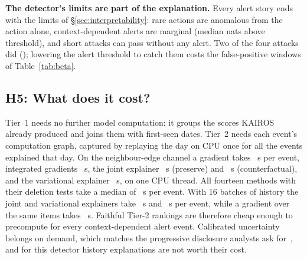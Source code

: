 \documentclass[conference]{IEEEtran}
\begin{document}
\textbf{The detector's limits are part of the explanation.} Every alert story ends with the limits of
\S\ref{sec:interpretability}: rare actions are anomalous from the action alone, context-dependent alerts
are marginal (median \HAWinMargin{} nats above threshold), and short attacks can pass without any alert.
Two of the four attacks did (\MissedAttacks{}); lowering the alert threshold to catch them costs the
false-positive windows of Table~\ref{tab:beta}.
\subsection{H5: What does it cost?}
Tier~1 needs no further model computation: it groups the scores KAIROS already produced and joins them
with first-seen dates. Tier~2 needs each event's computation graph, captured by replaying the day on CPU
once for all the events explained that day. On the neighbour-edge channel a gradient takes
\HAWinGradientTime{}~s per event, integrated gradients \HAWinIntGradTime{}~s, the joint explainer
\HAWinJointTime{}~s (preserve) and \HAWinJointCFTime{}~s (counterfactual), and the variational explainer
\HAWinVariationalTime{}~s, on one CPU thread. All fourteen methods with their deletion tests take a
median of \HAWallMedian{}~s per event. With 16 batches of history the joint and variational explainers
take \HBWinJointTime{}~s and \HBWinVariationalTime{}~s per event, while a gradient over the same items takes
\HBWinGradientTime{}~s. Faithful Tier-2 rankings are therefore cheap enough to precompute for every
context-dependent alert event. Calibrated uncertainty belongs on demand, which matches the progressive
disclosure analysts ask for~\cite{tmt}, and for this detector history explanations are not worth their cost.%
\end{document}
